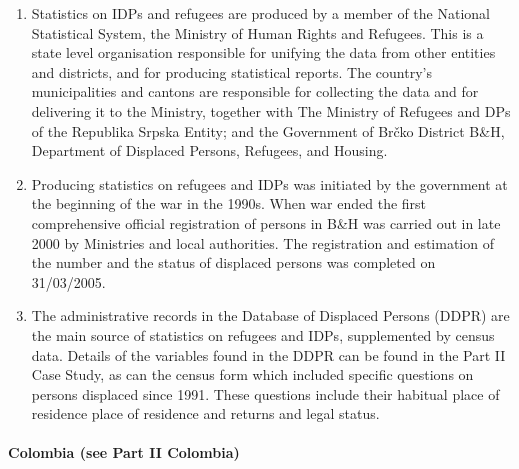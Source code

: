 \documentclass[
]{article}
\begin{document}
\begin{enumerate}
\def\labelenumi{\arabic{enumi}.}
\setcounter{enumi}{174}
\item
  Statistics on IDPs and refugees are produced by a member of the
  National Statistical System, the Ministry of Human Rights and
  Refugees. This is a state level organisation responsible for
  unifying the data from other entities and districts, and for
  producing statistical reports. The country's municipalities and
  cantons are responsible for collecting the data and for delivering
  it to the Ministry, together with The Ministry of Refugees and DPs
  of the Republika Srpska Entity; and the Government of Brčko District
  B\&H, Department of Displaced Persons, Refugees, and Housing.
\item
  Producing statistics on refugees and IDPs was initiated by the
  government at the beginning of the war in the 1990s. When war ended
  the first comprehensive official registration of persons in B\&H was
  carried out in late 2000 by Ministries and local authorities. The
  registration and estimation of the number and the status of
  displaced persons was completed on 31/03/2005.
\item
  The administrative records in the Database of Displaced Persons
  (DDPR) are the main source of statistics on refugees and IDPs,
  supplemented by census data. Details of the variables found in the
  DDPR can be found in the Part II Case Study, as can the census form
  which included specific questions on persons displaced since 1991.
  These questions include their habitual place of residence place of
  residence and returns and legal status.
\end{enumerate}

\hypertarget{colombia-see-part-ii-colombia}{%
\paragraph{Colombia (see Part II Colombia)}\label{colombia-see-part-ii-colombia}}
\end{document}
